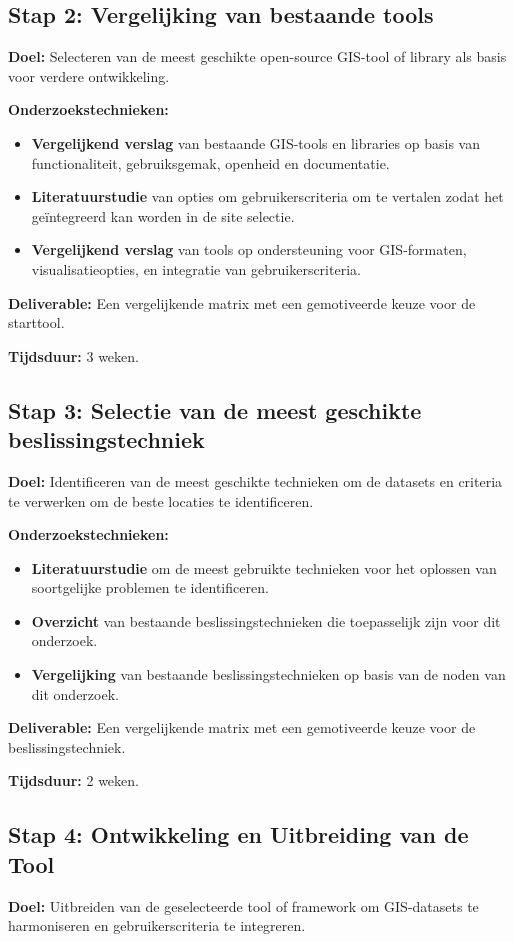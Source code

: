 \subsection{Stap 2: Vergelijking van bestaande tools}
\textbf{Doel:}
Selecteren van de meest geschikte open-\-source GIS-\-tool of library als basis voor verdere ontwikkeling.

\textbf{Onderzoekstechnieken:}
\begin{itemize}
    \item \textbf{Vergelijkend verslag} van bestaande GIS-\-tools en libraries op basis van functionaliteit, gebruiksgemak, openheid en documentatie.
    \item \textbf{Literatuurstudie} van opties om gebruikerscriteria om te vertalen zodat het geïntegreerd kan worden in de site selectie.
    \item \textbf{Vergelijkend verslag} van tools op ondersteuning voor GIS-\-formaten, visualisatieopties, en integratie van gebruikerscriteria.
\end{itemize}

\textbf{Deliverable:}
Een vergelijkende matrix met een gemotiveerde keuze voor de starttool.

\textbf{Tijdsduur:}
3 weken.

\subsection{Stap 3: Selectie van de meest geschikte beslissingstechniek}
\textbf{Doel:}
Identificeren van de meest geschikte technieken om de datasets en criteria te verwerken om de beste locaties te identificeren.

\textbf{Onderzoekstechnieken:}
\begin{itemize}
    \item \textbf{Literatuurstudie} om de meest gebruikte technieken voor het oplossen van soortgelijke problemen te identificeren.
    \item \textbf{Overzicht} van bestaande beslissingstechnieken die toepasselijk zijn voor dit onderzoek.
    \item \textbf{Vergelijking} van bestaande beslissingstechnieken op basis van de noden van dit onderzoek.
\end{itemize}

\textbf{Deliverable:}
Een vergelijkende matrix met een gemotiveerde keuze voor de beslissingstechniek.

\textbf{Tijdsduur:}
2 weken.

\subsection{Stap 4: Ontwikkeling en Uitbreiding van de Tool}
\textbf{Doel:}
Uitbreiden van de geselecteerde tool of framework om GIS-\-datasets te harmoniseren en gebruikerscriteria te integreren.

